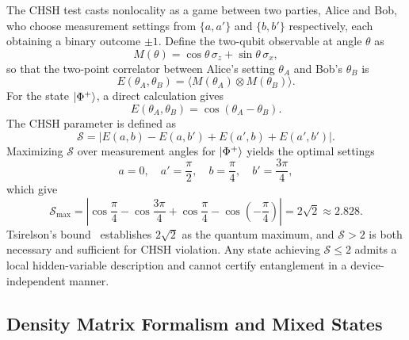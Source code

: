 \documentclass[12pt]{article}
\newcommand{\Phiplus}{\ket{\Phi^+}}
\newcommand{\bigS}{\mathcal{S}}
\begin{document}
The CHSH test casts nonlocality as a game between two parties, Alice and Bob, who choose
measurement settings from $\{a, a'\}$ and $\{b, b'\}$ respectively, each obtaining a binary
outcome $\pm 1$.
Define the two-qubit observable at angle $\theta$ as
\begin{equation}
  M(\theta) = \cos\theta\,\sigma_z + \sin\theta\,\sigma_x,
  \label{eq:meas_op}
\end{equation}
so that the two-point correlator between Alice's setting $\theta_A$ and Bob's $\theta_B$ is
\begin{equation}
  E(\theta_A, \theta_B) = \bigl\langle M(\theta_A) \otimes M(\theta_B) \bigr\rangle.
  \label{eq:correlator}
\end{equation}
For the state $\Phiplus$, a direct calculation gives
\begin{equation}
  E(\theta_A, \theta_B) = \cos(\theta_A - \theta_B).
  \label{eq:correlator_ideal}
\end{equation}
The CHSH parameter is defined as
\begin{equation}
  \bigS = \bigl|E(a,b) - E(a,b') + E(a',b) + E(a',b')\bigr|.
  \label{eq:chsh_def}
\end{equation}
Maximizing $\bigS$ over measurement angles for $\Phiplus$ yields the optimal settings
\begin{equation}
  a = 0,\quad a' = \frac{\pi}{2},\quad b = \frac{\pi}{4},\quad b' = \frac{3\pi}{4},
  \label{eq:optimal_angles}
\end{equation}
which give
\begin{equation}
  \bigS_{\max} = \left|\cos\frac{\pi}{4} - \cos\frac{3\pi}{4} + \cos\frac{\pi}{4} - \cos\left(-\frac{\pi}{4}\right)\right| = 2\sqrt{2} \approx 2.828.
  \label{eq:smax}
\end{equation}
Tsirelson's bound~\cite{tsirelson1980} establishes $2\sqrt{2}$ as the quantum maximum,
and $\bigS > 2$ is both necessary and sufficient for CHSH violation.
Any state achieving $\bigS \leq 2$ admits a local hidden-variable description and cannot certify
entanglement in a device-independent manner.

\subsection{Density Matrix Formalism and Mixed States}
\label{subsec:density_matrix}
\end{document}
